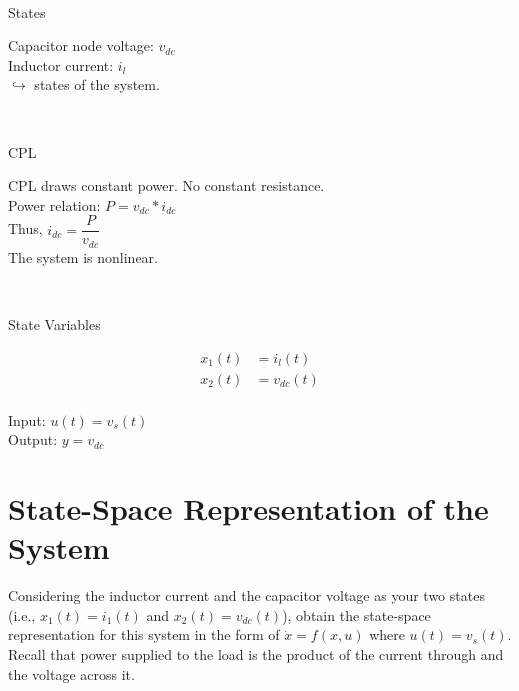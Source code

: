 \documentclass[12pt]{article}
\begin{document}
\

\large{States}
\normalsize{}
\begin{tcolorbox}[enhanced, frame hidden, colback=white, borderline west={1pt}{0pt}{gray}]
Capacitor node voltage: $v_{dc}$\\
Inductor current: ${i_l}$\\
$\hookrightarrow$ states of the system.
\end{tcolorbox}

\

\large{CPL}
\normalsize{}
\begin{tcolorbox}[enhanced, frame hidden, colback=white, borderline west={1pt}{0pt}{gray}]
CPL draws constant power. No constant resistance.\\

Power relation: $P = v_{dc} * i_{dc}$\\

Thus, $i_{dc} = \dfrac{P}{v_{dc}}$\\

The system is nonlinear.
\end{tcolorbox}

\

\large{State Variables}
\normalsize{}
\begin{tcolorbox}[enhanced, frame hidden, colback=white, borderline west={1pt}{0pt}{gray}]
  \begin{tcolorbox}[enhanced, frame hidden, colback=white, borderline west={1pt}{0pt}{gray}]
    \begin{align*}
      x_1(t) &= i_l(t)\\
      x_2(t) &= v_{dc}(t)\\
    \end{align*}
  \end{tcolorbox}
  Input: $u(t) = v_s(t)$\\
  Output: $y = v_{dc}$
\end{tcolorbox}


\newpage 

\section{State-Space Representation of the System}
Considering the inductor current and the capacitor voltage as your two states (i.e., $x_1(t) = i_1(t)$ and $x_2(t) = v_{dc}(t)$), obtain the state-space representation for this system in the form of $\dot{x} = f(x, u)$ where $u(t) = v_s(t)$. Recall that power supplied to the load is the product of the current through and the voltage across it.\\
\end{document}
